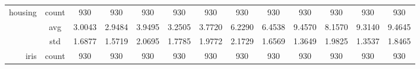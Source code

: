 \begin{table}[htbp]
{\begin{tabular}{rcccccccccccc}
                  housing                            & count                                  & 930                                                                                & 930                                                                       & 930                                                                       & 930                                                                       & 930                                           & 930                                         & 930                                            & 930                                            & 930                                            & 930                                            & 930                                            \\
                                                     & avg                                    & 3.0043                                                                             & \cellcolor[rgb]{ .776,  .937,  .808}\textcolor[rgb]{ 0,  .38,  0}{2.9484} & 3.9495                                                                    & 3.2505                                                                    & 3.7720                                        & 6.2290                                      & 6.4538                                         & 9.4570                                         & 8.1570                                         & 9.3140                                         & 9.4645                                         \\
                                                     & std                                    & 1.6877                                                                             & 1.5719                                                                    & 2.0695                                                                    & 1.7785                                                                    & 1.9772                                        & 2.1729                                      & 1.6569                                         & 1.3649                                         & 1.9825                                         & 1.3537                                         & 1.8465                                         \\
                  iris                               & count                                  & 930                                                                                & 930                                                                       & 930                                                                       & 930                                                                       & 930                                           & 930                                         & 930                                            & 930                                            & 930                                            & 930                                            & 930                                            \\

\end{tabular}}
\end{table}
